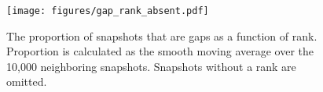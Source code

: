 

\begin{figure}[t]
\centering
\texttt{[image: figures/gap\_rank\_absent.pdf]}
\caption{The proportion of snapshots that are gaps as a function of rank. Proportion is calculated as the smooth moving average over the 10,000 neighboring snapshots. Snapshots without a rank are omitted.}
\label{fig:rank_absent}
\end{figure}

